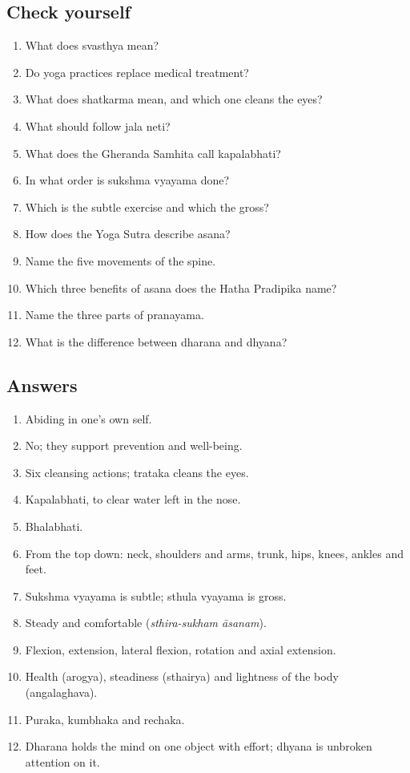 \subsection*{Check yourself}
\begin{enumerate}
\item What does svasthya mean?
\item Do yoga practices replace medical treatment?
\item What does shatkarma mean, and which one cleans the eyes?
\item What should follow jala neti?
\item What does the Gheranda Samhita call kapalabhati?
\item In what order is sukshma vyayama done?
\item Which is the subtle exercise and which the gross?
\item How does the Yoga Sutra describe asana?
\item Name the five movements of the spine.
\item Which three benefits of asana does the Hatha Pradipika name?
\item Name the three parts of pranayama.
\item What is the difference between dharana and dhyana?
\end{enumerate}

\subsection*{Answers}
\begin{enumerate}
\item Abiding in one's own self.
\item No; they support prevention and well-being.
\item Six cleansing actions; trataka cleans the eyes.
\item Kapalabhati, to clear water left in the nose.
\item Bhalabhati.
\item From the top down: neck, shoulders and arms, trunk, hips, knees, ankles and feet.
\item Sukshma vyayama is subtle; sthula vyayama is gross.
\item Steady and comfortable (\emph{sthira-sukham āsanam}).
\item Flexion, extension, lateral flexion, rotation and axial extension.
\item Health (arogya), steadiness (sthairya) and lightness of the body (angalaghava).
\item Puraka, kumbhaka and rechaka.
\item Dharana holds the mind on one object with effort; dhyana is unbroken attention on it.
\end{enumerate}

